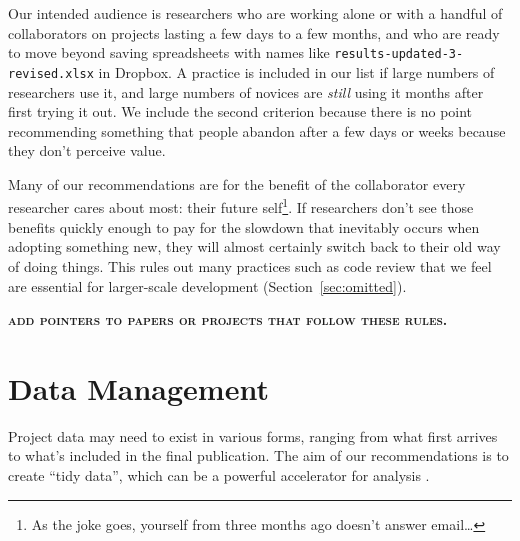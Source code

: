 \documentclass[10pt]{article}
\newcommand{\fixme}[1]{\textsc{\textbf{#1}}}
\begin{document}
Our intended audience is researchers who are working alone or with a
handful of collaborators on projects lasting a few days to a few
months, and who are ready to move beyond saving spreadsheets
with names like \texttt{results-updated-3-revised.xlsx} in Dropbox. A practice
is included in our list if large numbers of researchers use it, and large numbers
of novices are \emph{still} using it
months after first trying it out. We include the second criterion because
there is no point recommending something that people
abandon after a few days or weeks because they don't
perceive value.

Many of our recommendations are
for the benefit of the collaborator every researcher cares about most:
their future self\footnote{As the joke goes, yourself from three months ago doesn't
  answer email{\ldots}}. If researchers don't see those benefits
quickly enough to pay for the slowdown that inevitably occurs when
adopting something new, they will almost certainly switch
back to their old way of doing things.
This rules out many practices
such as code review that we feel are essential for larger-scale
development (Section~\ref{sec:omitted}).

\fixme{add pointers to papers or projects that follow these rules.}

\section{Data Management}\label{sec:data}

Project data may need to exist in various forms, ranging from what
first arrives to what's included in the final publication.  The aim
of our recommendations is to create ``tidy data'', which can be
a powerful accelerator for analysis \cite{wickham2014,hart2015}.
\end{document}
